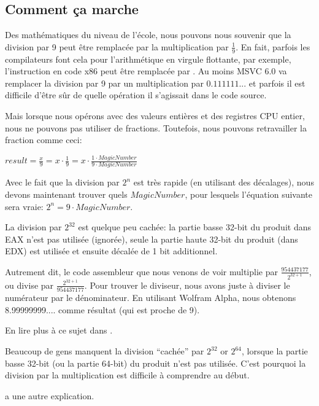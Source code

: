 ﻿\subsection{Comment ça marche}

Des mathématiques du niveau de l'école, nous pouvons nous souvenir que la division
par 9 peut être remplacée par la multiplication par $\frac{1}{9}$.
En fait, parfois les compilateurs font cela pour l'arithmétique en virgule flottante,
par exemple, l'instruction  en code x86 peut être remplacée par .
Au moins MSVC 6.0 va remplacer la division par 9 par un multiplication par $0.111111...$
et parfois il est difficile d'être sûr de quelle opération il s'agissait dans le
code source.

Mais lorsque nous opérons avec des valeurs entières et des registres CPU entier,
nous ne pouvons pas utiliser de fractions.
Toutefois, nous pouvons retravailler la fraction comme ceci:

\begin{center}
$result = \frac{x}{9} = x \cdot \frac{1}{9} = x \cdot \frac{1 \cdot MagicNumber}{9 \cdot MagicNumber}$
\end{center}

Avec le fait que la division par $2^n$ est très rapide (en utilisant des décalages),
nous devons maintenant trouver quels $MagicNumber$, pour lesquels l'équation suivante
sera vraie: $2^n = 9 \cdot MagicNumber$.

La division par $2^{32}$ est quelque peu cachée: la partie basse 32-bit du produit
dans EAX n'est pas utilisée (ignorée), seule la partie haute 32-bit du produit
(dans EDX) est utilisée et ensuite décalée de 1 bit additionnel.

Autrement dit, le code assembleur que nous venons de voir multiplie par {\Large $\frac{954437177}{2^{32+1}}$},
ou divise par {\Large $\frac{2^{32+1}}{954437177}$}.
Pour trouver le diviseur, nous avons juste à diviser le numérateur par le dénominateur.
En utilisant Wolfram Alpha, nous obtenons 8.99999999.... comme résultat (qui est
proche de 9).


En lire plus à ce sujet dans .

Beaucoup de gens manquent la division ``cachée'' par $2^{32}$ or $2^{64}$, lorsque
la partie basse 32-bit (ou la partie 64-bit) du produit n'est pas utilisée.
C'est pourquoi la division par la multiplication est difficile à comprendre au début.

\MathForProg a une autre explication.
